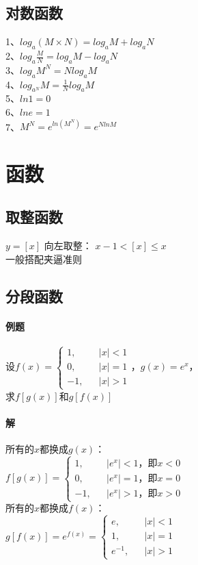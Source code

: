 \documentclass{article}
\begin{document}
\begin{flushleft}
	\subsection{对数函数}
	1、$log_a(M\times N)=log_aM+log_aN$\\
	2、$log_a\frac{M}{N}=log_aM-log_aN$\\
	3、$log_aM^N=Nlog_aM$\\
	4、$log_{a^N}M=\frac{1}{N}log_aM$\\
	5、$ln1=0$\\
	6、$lne=1$\\
	7、$M^N=e^{ln(M^N)}=e^{NlnM}$\\
	
	
	\section{函数}
	
	\subsection{取整函数}
	$y=[x]$ 向左取整： $x-1<[x]\leq x$\\
	一般搭配夹逼准则\\
	
	\subsection{分段函数}
	
	\paragraph{例题}
	设$f(x)=\left\{
	\begin{array}{rcl}
		1,& & |x|<1\\
		0,& & |x|=1\\
		-1,& & |x|>1
	\end{array} \right.，g(x)=e^x$，\\
	求$f[g(x)]$和$g[f(x)]$
	\paragraph{解}
	所有的$x$都换成$g(x)$：\\
	$f[g(x)]=\left\{
	\begin{array}{rcl}
		1,& & |e^x|<1，\mbox{即}x<0\\
		0,& & |e^x|=1，\mbox{即}x=0\\
		-1,& & |e^x|>1，\mbox{即}x>0
	\end{array} \right.$\\
	所有的$x$都换成$f(x)$：\\
	$g[f(x)]=e^{f(x)}=\left\{
	\begin{array}{rcl}
		e,& & |x|<1\\
		1,& & |x|=1\\
		e^{-1},& & |x|>1
	\end{array} \right.$\\
	

\end{flushleft}
\end{document}
